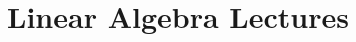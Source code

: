 
\title{Linear Algebra Lectures}


\date{}




%

%

%




%
%
%


%

%

%
%


%

%


%



%

%


%

%

%


%


%



%



%


%


%


%


%



%
%
%
%
%
%
%
%
%
%
%




%


%
%
%
%
%
%

%

%


%


%


